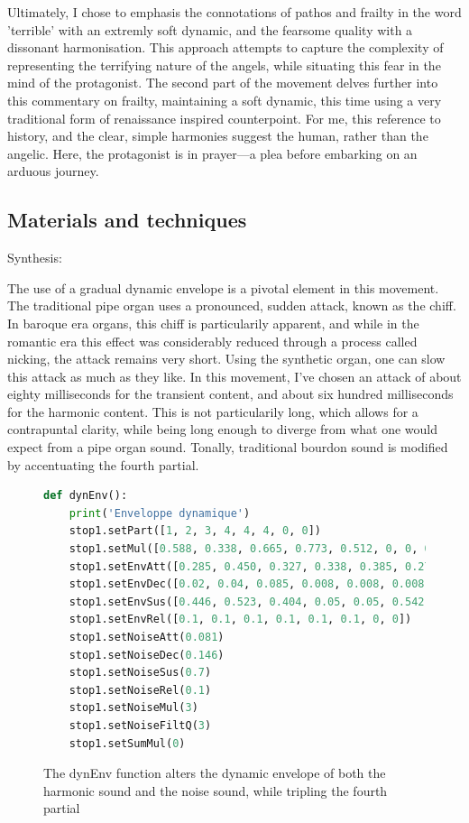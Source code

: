 \documentclass[12pt,twoside,maitrise]{dms_ks}
\theoremstyle{definition}
\begin{document}
{Ultimately, I chose to emphasis the connotations of pathos and frailty in the word 'terrible' with an extremly soft dynamic, and the fearsome quality with a dissonant harmonisation.
This approach attempts to capture the complexity of representing the terrifying nature of the angels, while situating this fear in the mind of the protagonist.
The second part of the movement delves further into this commentary on frailty, maintaining a soft dynamic, this time using a very traditional form of renaissance inspired counterpoint.
For me, this reference to history, and the clear, simple harmonies suggest the human, rather than the angelic.
Here, the protagonist is in prayer---a plea before embarking on an arduous journey.

\subsection{Materials and techniques}

Synthesis:

The use of a gradual dynamic envelope is a pivotal element in this movement.
The traditional pipe organ uses a pronounced, sudden attack, known as the chiff.
In baroque era organs, this chiff is particularily apparent, and while in the romantic era this effect was considerably reduced through a process called nicking, the attack remains very short.
Using the synthetic organ, one can slow this attack as much as they like. 
In this movement, I've chosen an attack of about eighty milliseconds for the transient content, and about six hundred milliseconds for the harmonic content. This is not particularily long, which allows for a contrapuntal clarity, while being long enough to diverge from what one would expect from a pipe organ sound.
Tonally, traditional bourdon sound is modified by accentuating the fourth partial.

\begin{figure}[H]
\begin{lstlisting}[language=Python]
def dynEnv():
    print('Enveloppe dynamique')
    stop1.setPart([1, 2, 3, 4, 4, 4, 0, 0])
    stop1.setMul([0.588, 0.338, 0.665, 0.773, 0.512, 0, 0, 0])
    stop1.setEnvAtt([0.285, 0.450, 0.327, 0.338, 0.385, 0.277, 0, 0])
    stop1.setEnvDec([0.02, 0.04, 0.085, 0.008, 0.008, 0.008, 0, 0])
    stop1.setEnvSus([0.446, 0.523, 0.404, 0.05, 0.05, 0.542, 0, 0])
    stop1.setEnvRel([0.1, 0.1, 0.1, 0.1, 0.1, 0.1, 0, 0])
    stop1.setNoiseAtt(0.081)
    stop1.setNoiseDec(0.146)
    stop1.setNoiseSus(0.7)
    stop1.setNoiseRel(0.1)
    stop1.setNoiseMul(3)
    stop1.setNoiseFiltQ(3)
    stop1.setSumMul(0)
\end{lstlisting}
\caption{The dynEnv function alters the dynamic envelope of both the harmonic sound and the noise sound, while tripling the fourth partial}
\end{figure}

}
\end{document}
